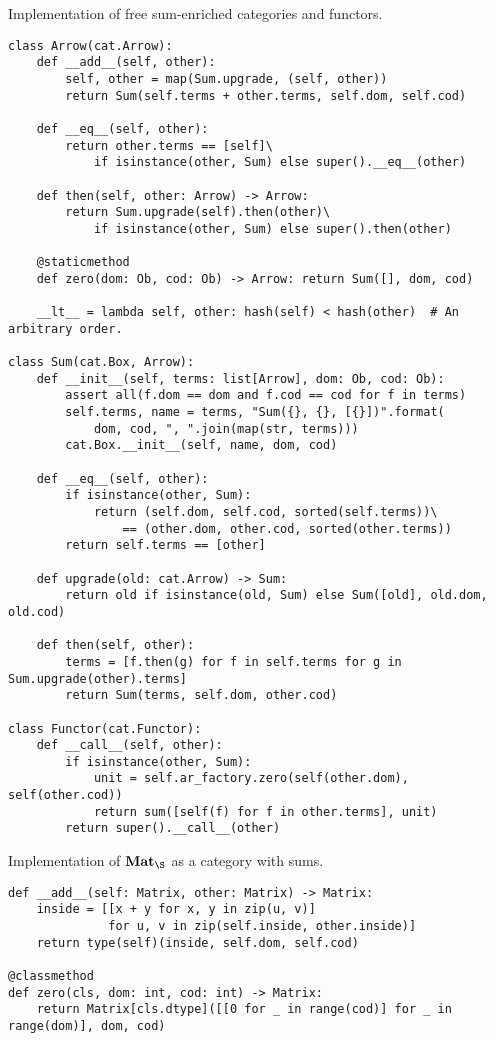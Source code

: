 \begin{python}
{\normalfont Implementation of free sum-enriched categories and functors.}

\begin{verbatim}
class Arrow(cat.Arrow):
    def __add__(self, other):
        self, other = map(Sum.upgrade, (self, other))
        return Sum(self.terms + other.terms, self.dom, self.cod)

    def __eq__(self, other):
        return other.terms == [self]\
            if isinstance(other, Sum) else super().__eq__(other)

    def then(self, other: Arrow) -> Arrow:
        return Sum.upgrade(self).then(other)\
            if isinstance(other, Sum) else super().then(other)

    @staticmethod
    def zero(dom: Ob, cod: Ob) -> Arrow: return Sum([], dom, cod)

    __lt__ = lambda self, other: hash(self) < hash(other)  # An arbitrary order.

class Sum(cat.Box, Arrow):
    def __init__(self, terms: list[Arrow], dom: Ob, cod: Ob):
        assert all(f.dom == dom and f.cod == cod for f in terms)
        self.terms, name = terms, "Sum({}, {}, [{}])".format(
            dom, cod, ", ".join(map(str, terms)))
        cat.Box.__init__(self, name, dom, cod)

    def __eq__(self, other):
        if isinstance(other, Sum):
            return (self.dom, self.cod, sorted(self.terms))\
                == (other.dom, other.cod, sorted(other.terms))
        return self.terms == [other]

    def upgrade(old: cat.Arrow) -> Sum:
        return old if isinstance(old, Sum) else Sum([old], old.dom, old.cod)

    def then(self, other):
        terms = [f.then(g) for f in self.terms for g in Sum.upgrade(other).terms]
        return Sum(terms, self.dom, other.cod)

class Functor(cat.Functor):
    def __call__(self, other):
        if isinstance(other, Sum):
            unit = self.ar_factory.zero(self(other.dom), self(other.cod))
            return sum([self(f) for f in other.terms], unit)
        return super().__call__(other)
\end{verbatim}
\end{python}

\begin{python}
{\normalfont Implementation of $\mathbf{Mat}_\S$ as a category with sums.}

\begin{verbatim}
def __add__(self: Matrix, other: Matrix) -> Matrix:
    inside = [[x + y for x, y in zip(u, v)]
              for u, v in zip(self.inside, other.inside)]
    return type(self)(inside, self.dom, self.cod)

@classmethod
def zero(cls, dom: int, cod: int) -> Matrix:
    return Matrix[cls.dtype]([[0 for _ in range(cod)] for _ in range(dom)], dom, cod)
\end{verbatim}
\end{python}

